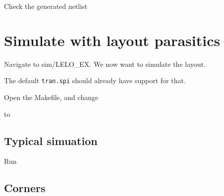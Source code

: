 Check the generated netlist

\begin{Shaded}
\begin{Highlighting}[]
\end{Highlighting}
\end{Shaded}

\section{\texorpdfstring{Simulate with layout parasitics
}{Simulate with layout parasitics }}\label{simulate-with-layout-parasitics}

Navigate to sim/LELO\_EX. We now want to simulate the layout.

The default \texttt{tran.spi} should already have support for that.

Open the Makefile, and change

\begin{Shaded}
\begin{Highlighting}[]
\OperatorTok{=}
\end{Highlighting}
\end{Shaded}

to

\begin{Shaded}
\begin{Highlighting}[]
\OperatorTok{=}
\end{Highlighting}
\end{Shaded}

\subsection{Typical simuation}\label{typical-simuation}

Run

\begin{Shaded}
\begin{Highlighting}[]
\end{Highlighting}
\end{Shaded}

\subsection{Corners}\label{corners}

